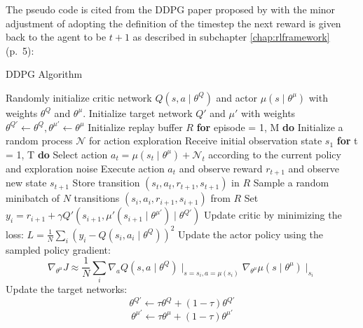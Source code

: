 The pseudo code is cited from the DDPG paper proposed by \cite{lillicrap2019continuous} with the minor adjustment of adopting the definition of the timestep the next reward is given back to the agent to be $t+1$ as described in subchapter \ref{chap:rlframework} (p.~5):
\begin{algorithm}[H]
    \caption{DDPG Algorithm}
    \begin{algorithmic}[1]
        \State Randomly initialize critic network $Q(s,a \mid \theta^Q)$ and actor $\mu(s \mid \theta^\mu)$ with weights $\theta^Q$ and $\theta^\mu$.
        \State Initialize target network $Q'$ and $\mu'$ with weights $\theta^{Q'} \leftarrow \theta^Q , \theta^{\mu'} \leftarrow \theta^\mu$ 
        \State Initialize replay buffer $R$
        \State \textbf{for} episode = 1, M \textbf{do}
        \Indent
            \State Initialize a random process $\mathcal{N}$ for action exploration
            \State Receive initial observation state $s_1$
            \State \textbf{for} t = 1, T \textbf{do}
            \Indent
                \State Select action $a_t = \mu(s_t \mid \theta^\mu) + \mathcal{N}_t$ according to the current policy and exploration noise
                \State Execute action $a_t$ and observe reward $r_{t+1}$ and observe new state $s_{t+1}$
                \State Store transition $(s_t, a_t, r_{t+1}, s_{t+1})$ in $R$
                \State Sample a random minibatch of $N$ transitions $(s_i,a_i, r_{i+1}, s_{i+1})$ from $R$
                \State Set $y_i = r_{i+1} + \gamma Q' (s_{i+1}, \mu'(s_{i+1} \mid \theta^{\mu'})  \mid \theta^{Q'})$
                \State Update critic by minimizing the loss: 
                $L = \frac{1}{N} \sum_i{(y_i - Q(s_i, a_i \mid \theta^Q))^2}$
                \State Update the actor policy using the sampled policy gradient:
                \State \begin{equation*}
                    \nabla_{\theta^\mu} J \approx \frac{1}{N}
                    \sum_i{\nabla_a Q(s, a \mid \theta^Q) 
                    \mid_{s = s_i, a=\mu(s_i)} \nabla_{\theta^\mu} \mu(s \mid \theta^\mu) \mid_{s_i}}
                \end{equation*}
                \State Update the target networks:
                \State \begin{equation*}
                    \theta^{Q'} \leftarrow \tau \theta^Q
 + (1- \tau) \theta^{Q'}                \end{equation*}
 \begin{equation*}
                    \theta^{\mu'} \leftarrow \tau \theta^\mu
 + (1- \tau) \theta^{\mu'}                \end{equation*}
 
            \EndIndent
        \EndIndent
    \end{algorithmic}
\end{algorithm}